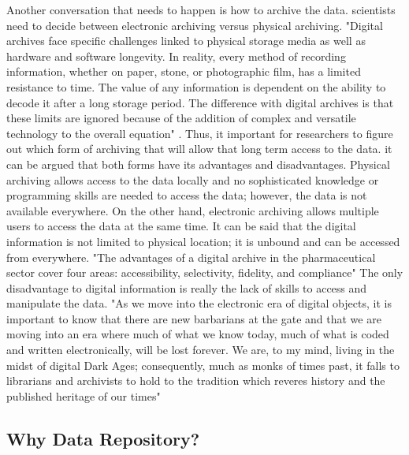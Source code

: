 \documentclass[sigconf]{acmart}
\begin{document}
Another conversation that needs to happen is how to archive the data. scientists need to decide between electronic archiving versus physical archiving. "Digital archives face specific challenges linked to physical storage media as well as hardware and software longevity. In reality, every method of recording information, whether on paper, stone, or photographic film, has a limited resistance to time. The value of any information is dependent on the ability to decode it after a long storage period. The difference with digital archives is that these limits are ignored because of the addition of complex and versatile technology to the overall equation" \cite{stamatiadis2005digital}. Thus, it important for researchers to figure out which form of archiving that will allow that long term access to the data. it can be argued that both forms have its advantages and disadvantages. Physical archiving allows access to the data locally and no sophisticated knowledge or programming skills are needed to access the data; however, the data is not available everywhere. On the other hand, electronic archiving allows multiple users to access the data at the same time. It can be said that the digital information is not limited to physical location; it is unbound and can be accessed from everywhere. "The advantages of a digital archive in the pharmaceutical sector cover four
areas: accessibility, selectivity, fidelity, and compliance" \cite{stamatiadis2005digital} The only disadvantage to digital information is really the lack of skills to access and manipulate the data. "As we move into the electronic era of digital objects, it is important to know that there are new barbarians at the gate and that we are moving into an era where much of what we know today, much of what is coded and written electronically, will be lost forever. We are, to my mind, living in the midst of digital Dark Ages; consequently, much as monks of times past, it falls to librarians and archivists to hold to the tradition which reveres history and the published heritage of our times" \cite{stamatiadis2005digital} 

 
\subsection*{Why Data Repository?}
\end{document}

